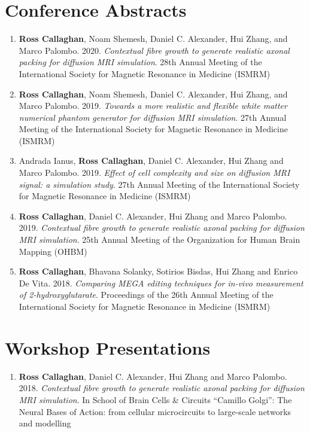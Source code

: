 \section*{Conference Abstracts}
\begin{enumerate}
  \item \textbf{Ross Callaghan}, Noam Shemesh, Daniel C. Alexander, Hui Zhang, and Marco Palombo. 2020. \emph{Contextual fibre growth to generate realistic axonal packing for diffusion MRI simulation}. 28th Annual Meeting of the International Society for Magnetic Resonance in Medicine (ISMRM)
  \item \textbf{Ross Callaghan}, Noam Shemesh, Daniel C. Alexander, Hui Zhang, and Marco Palombo. 2019. \emph{Towards a more realistic and flexible white matter numerical phantom generator for diffusion MRI simulation}. 27th Annual Meeting of the International Society for Magnetic Resonance in Medicine (ISMRM)
  \item Andrada Ianus, \textbf{Ross Callaghan}, Daniel C. Alexander, Hui Zhang and Marco Palombo. 2019. \emph{Effect of cell complexity and size on diffusion MRI signal: a simulation study}. 27th Annual Meeting of the International Society for Magnetic Resonance in Medicine (ISMRM)
  \item \textbf{Ross Callaghan}, Daniel C. Alexander, Hui Zhang and Marco Palombo. 2019. \emph{Contextual fibre growth to generate realistic axonal packing for diffusion MRI simulation}. 25th Annual Meeting of the  Organization for Human Brain Mapping (OHBM)
  \item \textbf{Ross Callaghan}, Bhavana Solanky, Sotirios Bisdas, Hui Zhang and Enrico De Vita. 2018. \emph{Comparing MEGA editing techniques for in-vivo measurement of 2-hydroxyglutarate}. Proceedings of the 26th Annual Meeting of the International Society for Magnetic Resonance in Medicine (ISMRM)
\end{enumerate}



\section*{Workshop Presentations}
\begin{enumerate}
\item \textbf{Ross Callaghan}, Daniel C. Alexander, Hui Zhang and Marco Palombo. 2018. \emph{Contextual fibre growth to generate realistic axonal packing for diffusion MRI simulation}. In School of Brain Cells \& Circuits “Camillo Golgi”: The Neural Bases of Action: from cellular microcircuits to large-scale networks and modelling
\end{enumerate}


